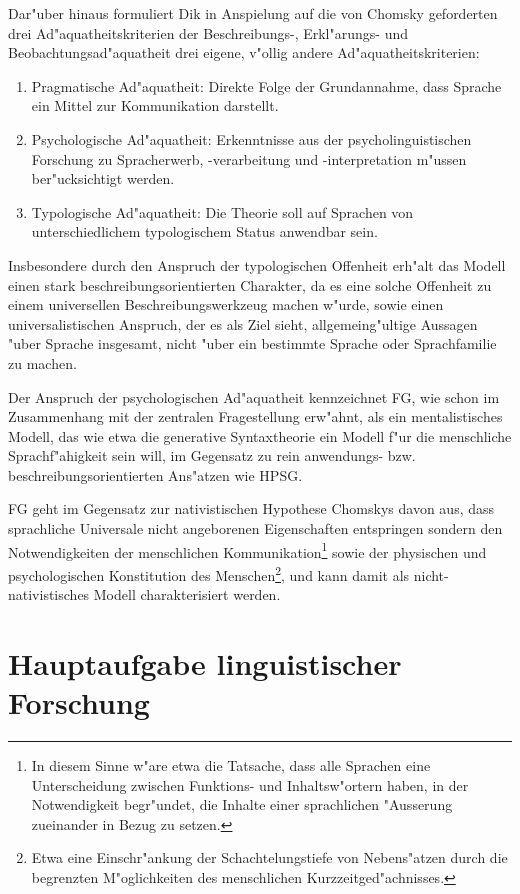 \documentclass[a4paper]{article}
\begin{document}
Dar"uber hinaus formuliert Dik in Anspielung auf die von Chomsky geforderten
drei Ad"aquatheitskriterien der Beschreibungs-, Erkl"arungs- und
Beobachtungsad"aquatheit drei eigene, v"ollig andere Ad"aquatheitskriterien:

\begin{enumerate}
  \item {Pragmatische Ad"aquatheit: Direkte Folge der Grundannahme, dass
  Sprache ein Mittel zur Kommunikation darstellt.}
  \item {Psychologische Ad"aquatheit: Erkenntnisse aus der
  psycho\-linguistischen Forschung zu Sprach\-erwerb, -ver\-ar\-bei\-tung und
  -inter\-preta\-tion m"ussen ber"ucksichtigt werden.}
  \item {Typologische Ad"aquatheit: Die Theorie soll auf Sprachen von
  unterschiedlichem typologischem Status anwendbar sein.}
\end{enumerate}

Insbesondere durch den Anspruch der typologischen Offenheit erh"alt das Modell
einen stark beschreibungsorientierten Charakter, da es eine solche Offenheit zu
einem universellen Beschreibungswerkzeug machen w"urde, sowie einen
universalistischen Anspruch, der es als Ziel sieht, allgemeing"ultige Aussagen
"uber Sprache insgesamt, nicht "uber ein bestimmte Sprache oder Sprachfamilie
zu machen.

Der Anspruch der psychologischen Ad"aquatheit kennzeichnet FG,
wie schon im Zusammenhang mit der zentralen Fragestellung erw"ahnt, als ein
mentalistisches Modell, das wie etwa die generative Syntaxtheorie ein Modell
f"ur die menschliche Sprachf"ahigkeit sein will, im Gegensatz zu rein
anwendungs- bzw. beschreibungsorientierten Ans"atzen wie HPSG.

FG geht im Gegensatz zur nativistischen Hypothese Chomskys
davon aus, dass sprachliche Universale nicht angeborenen Eigenschaften
entspringen sondern den Notwendigkeiten der menschlichen
Kommunikation\footnote{In diesem Sinne w"are etwa die Tatsache, dass alle
Sprachen eine Unterscheidung zwischen Funktions- und Inhaltsw"ortern haben, in
der Notwendigkeit begr"undet, die Inhalte einer sprachlichen "Ausserung
zueinander in Bezug zu setzen.} sowie der physischen und psychologischen
Konstitution des Menschen\footnote{Etwa eine Einschr"ankung der
Schachtelungstiefe von Nebens"atzen durch die begrenzten M"oglichkeiten des
menschlichen Kurzzeitged"achnisses.}, und kann damit als nicht-nativistisches
Modell charakterisiert werden.

\section{Hauptaufgabe linguistischer Forschung}
\end{document}
